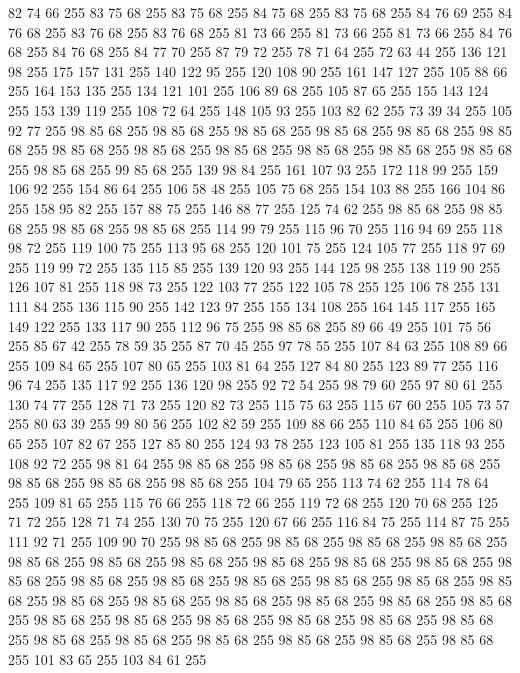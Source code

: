82 74 66 255 83 75 68 255 83 75 68 255 84 75 68 255 83 75 68 255 84 76 69 255 84 76 68 255 83 76 68 255 83 76 68 255 81 73 66 255 81 73 66 255 81 73 66 255 84 76 68 255 84 76 68 255 84 77 70 255 87 79 72 255 78 71 64 255 72 63 44 255 136 121 98 255 175 157 131 255 140 122 95 255 120 108 90 255 161 147 127 255 105 88 66 255 164 153 135 255 134 121 101 255 106 89 68 255 105 87 65 255 155 143 124 255 153 139 119 255 108 72 64 255 148 105 93 255 103 82 62 255 73 39 34 255 105 92 77 255 98 85 68 255 98 85 68 255 98 85 68 255 98 85 68 255 98 85 68 255 98 85 68 255 98 85 68 255 98 85 68 255 98 85 68 255 98 85 68 255 98 85 68 255 98 85 68 255 98 85 68 255 99 85 68 255 139 98 84 255 161 107 93 255 172 118 99 255 159 106 92 255 154 86 64 255 106 58 48 255 105 75 68 255 154 103 88 255 166 104 86 255 158 95 82 255 157 88 75 255 146 88 77 255 125 74 62 255 98 85 68 255 98 85 68 255
98 85 68 255 98 85 68 255 114 99 79 255 115 96 70 255 116 94 69 255 118 98 72 255 119 100 75 255 113 95 68 255 120 101 75 255 124 105 77 255 118 97 69 255 119 99 72 255 135 115 85 255 139 120 93 255 144 125 98 255 138 119 90 255 126 107 81 255 118 98 73 255 122 103 77 255 122 105 78 255 125 106 78 255 131 111 84 255 136 115 90 255 142 123 97 255 155 134 108 255 164 145 117 255 165 149 122 255 133 117 90 255 112 96 75 255 98 85 68 255 89 66 49 255 101 75 56 255 85 67 42 255 78 59 35 255 87 70 45 255 97 78 55 255 107 84 63 255 108 89 66 255 109 84 65 255 107 80 65 255 103 81 64 255 127 84 80 255 123 89 77 255 116 96 74 255 135 117 92 255 136 120 98 255 92 72 54 255 98 79 60 255 97 80 61 255 130 74 77 255 128 71 73 255 120 82 73 255 115 75 63 255 115 67 60 255 105 73 57 255 80 63 39 255 99 80 56 255 102 82 59 255 109 88 66 255 110 84 65 255 106 80 65 255 107 82 67 255 127 85 80 255 124 93 78 255
123 105 81 255 135 118 93 255 108 92 72 255 98 81 64 255 98 85 68 255 98 85 68 255 98 85 68 255 98 85 68 255 98 85 68 255 98 85 68 255 98 85 68 255 104 79 65 255 113 74 62 255 114 78 64 255 109 81 65 255 115 76 66 255 118 72 66 255 119 72 68 255 120 70 68 255 125 71 72 255 128 71 74 255 130 70 75 255 120 67 66 255 116 84 75 255 114 87 75 255 111 92 71 255 109 90 70 255 98 85 68 255 98 85 68 255 98 85 68 255 98 85 68 255 98 85 68 255 98 85 68 255 98 85 68 255 98 85 68 255 98 85 68 255 98 85 68 255 98 85 68 255 98 85 68 255 98 85 68 255 98 85 68 255 98 85 68 255 98 85 68 255 98 85 68 255 98 85 68 255 98 85 68 255 98 85 68 255 98 85 68 255 98 85 68 255 98 85 68 255 98 85 68 255 98 85 68 255 98 85 68 255 98 85 68 255 98 85 68 255 98 85 68 255 98 85 68 255 98 85 68 255 98 85 68 255 98 85 68 255 98 85 68 255 98 85 68 255 101 83 65 255 103 84 61 255
